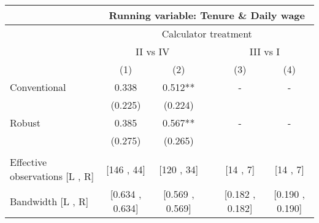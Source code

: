 \begin{tabular}{lccccc}
\toprule
      & \multicolumn{5}{c}{Running variable: Tenure \& Daily wage} \\
\midrule
      & \multicolumn{5}{c}{Calculator treatment} \\
\midrule
      & \multicolumn{2}{c}{II vs IV} &       & \multicolumn{2}{c}{III vs I} \\
\cmidrule{2-3}\cmidrule{5-6}      & (1)   & (2)   &       & (3)   & (4) \\
\midrule
\midrule
Conventional & 0.338 & 0.512** &       & -     & - \\
      & (0.225) & (0.224) &       &       &  \\
Robust & 0.385 & 0.567** &       & -     & - \\
      & (0.275) & (0.265) &       &       &  \\
      &       &       &       &       &  \\
\midrule
Effective observations [L , R] & [146 ,  44] & [120 ,  34] &       & [14 ,  7] & [14 ,  7] \\
Bandwidth [L , R] & [0.634 ,  0.634] & [0.569 ,  0.569] &       & [0.182 ,  0.182] & [0.190 ,  0.190] \\
\bottomrule
\bottomrule
\end{tabular}%
